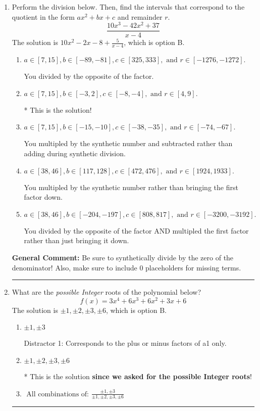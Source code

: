 \documentclass{extbook}[14pt]
\newcommand{\litem}[1]{\item #1

\rule{\textwidth}{0.4pt}}
\begin{document}
\begin{enumerate}\litem{
Perform the division below. Then, find the intervals that correspond to the quotient in the form $ax^2+bx+c$ and remainder $r$.
\[ \frac{10x^{3} -42 x^{2} + 37}{x -4} \]The solution is \( 10x^{2} -2 x -8 + \frac{5}{x -4} \), which is option B.\begin{enumerate}[label=\Alph*.]
\item \( a \in [7, 15], b \in [-89, -81], c \in [325, 333], \text{ and } r \in [-1276, -1272]. \)

 You divided by the opposite of the factor.
\item \( a \in [7, 15], b \in [-3, 2], c \in [-8, -4], \text{ and } r \in [4, 9]. \)

* This is the solution!
\item \( a \in [7, 15], b \in [-15, -10], c \in [-38, -35], \text{ and } r \in [-74, -67]. \)

 You multipled by the synthetic number and subtracted rather than adding during synthetic division.
\item \( a \in [38, 46], b \in [117, 128], c \in [472, 476], \text{ and } r \in [1924, 1933]. \)

 You multipled by the synthetic number rather than bringing the first factor down.
\item \( a \in [38, 46], b \in [-204, -197], c \in [808, 817], \text{ and } r \in [-3200, -3192]. \)

 You divided by the opposite of the factor AND multipled the first factor rather than just bringing it down.
\end{enumerate}

\textbf{General Comment:} Be sure to synthetically divide by the zero of the denominator! Also, make sure to include 0 placeholders for missing terms.
}
\litem{
What are the \textit{possible Integer} roots of the polynomial below?
\[ f(x) = 3x^{4} +6 x^{3} +6 x^{2} +3 x + 6 \]The solution is \( \pm 1,\pm 2,\pm 3,\pm 6 \), which is option B.\begin{enumerate}[label=\Alph*.]
\item \( \pm 1,\pm 3 \)

 Distractor 1: Corresponds to the plus or minus factors of a1 only.
\item \( \pm 1,\pm 2,\pm 3,\pm 6 \)

* This is the solution \textbf{since we asked for the possible Integer roots}!
\item \( \text{ All combinations of: }\frac{\pm 1,\pm 3}{\pm 1,\pm 2,\pm 3,\pm 6} \)


\end{enumerate}}
\end{enumerate}
\end{document}
